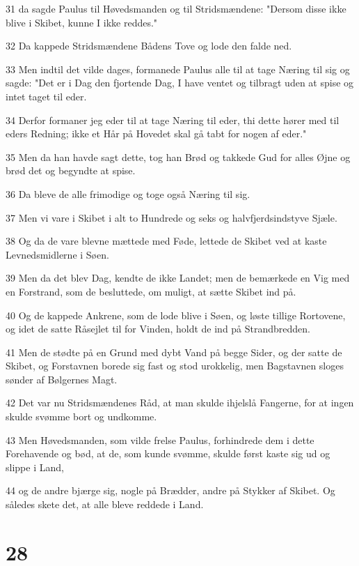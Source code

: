 \par 31 da sagde Paulus til Høvedsmanden og til Stridsmændene: "Dersom disse ikke blive i Skibet, kunne I ikke reddes."
\par 32 Da kappede Stridsmændene Bådens Tove og lode den falde ned.
\par 33 Men indtil det vilde dages, formanede Paulus alle til at tage Næring til sig og sagde: "Det er i Dag den fjortende Dag, I have ventet og tilbragt uden at spise og intet taget til eder.
\par 34 Derfor formaner jeg eder til at tage Næring til eder, thi dette hører med til eders Redning; ikke et Hår på Hovedet skal gå tabt for nogen af eder."
\par 35 Men da han havde sagt dette, tog han Brød og takkede Gud for alles Øjne og brød det og begyndte at spise.
\par 36 Da bleve de alle frimodige og toge også Næring til sig.
\par 37 Men vi vare i Skibet i alt to Hundrede og seks og halvfjerdsindstyve Sjæle.
\par 38 Og da de vare blevne mættede med Føde, lettede de Skibet ved at kaste Levnedsmidlerne i Søen.
\par 39 Men da det blev Dag, kendte de ikke Landet; men de bemærkede en Vig med en Forstrand, som de besluttede, om muligt, at sætte Skibet ind på.
\par 40 Og de kappede Ankrene, som de lode blive i Søen, og løste tillige Rortovene, og idet de satte Råsejlet til for Vinden, holdt de ind på Strandbredden.
\par 41 Men de stødte på en Grund med dybt Vand på begge Sider, og der satte de Skibet, og Forstavnen borede sig fast og stod urokkelig, men Bagstavnen sloges sønder af Bølgernes Magt.
\par 42 Det var nu Stridsmændenes Råd, at man skulde ihjelslå Fangerne, for at ingen skulde svømme bort og undkomme.
\par 43 Men Høvedsmanden, som vilde frelse Paulus, forhindrede dem i dette Forehavende og bød, at de, som kunde svømme, skulde først kaste sig ud og slippe i Land,
\par 44 og de andre bjærge sig, nogle på Brædder, andre på Stykker af Skibet. Og således skete det, at alle bleve reddede i Land.

\chapter{28}

